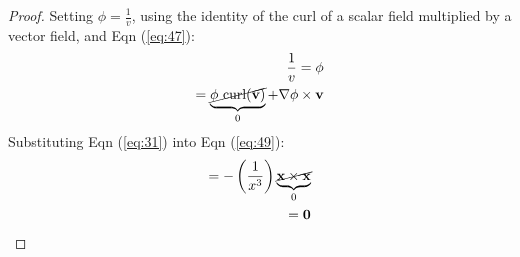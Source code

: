 \begin{enumerate}
        \begin{proof}
            Setting $\phi=\frac{1}{v}$, using the identity of the curl of a scalar field multiplied by a vector field, and Eqn (\ref{eq:47}):
            \begin{align}
            \frac{1}{v}=\phi \\
            =\underbrace{ \cancel{ \phi \ \text{curl}(\mathbf{v}) } }_{ 0 }+\nabla \phi \times \mathbf{v}\label{eq:49}
            \end{align}
            Substituting Eqn (\ref{eq:31}) into Eqn (\ref{eq:49}):
            \begin{align}
            =-\left( \frac{1}{x^3} \right)\underbrace{ \cancel{ \mathbf{x}\times \mathbf{x} } }_{ 0 } \\
            =\mathbf{0}
            \end{align}

        \end{proof}
    \end{enumerate}
   \pagebreak 
